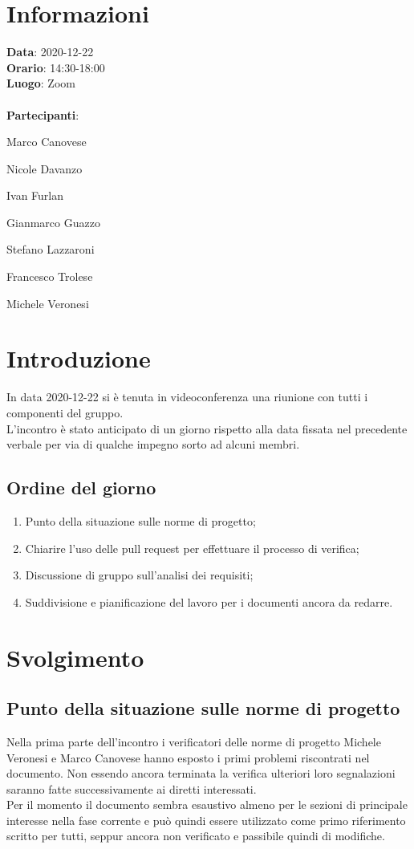 \section{Informazioni}
\textbf{Data}: 2020-12-22\\
\textbf{Orario}: 14:30-18:00\\
\textbf{Luogo}: Zoom\\\\
\textbf{Partecipanti}:\begin{list}{*}{\setlength{\itemsep}{0cm}}
	\item Marco Canovese
	\item Nicole Davanzo
	\item Ivan Furlan
	\item Gianmarco Guazzo
	\item Stefano Lazzaroni
	\item Francesco Trolese
	\item Michele Veronesi
\end{list}

\section{Introduzione}
In data 2020-12-22 si è tenuta in videoconferenza una riunione con tutti i componenti del gruppo. \\
L'incontro è stato anticipato di un giorno rispetto alla data fissata nel precedente verbale per via di qualche impegno sorto ad alcuni membri. 

\subsection{Ordine del giorno}
\begin{enumerate}
    \item Punto della situazione sulle norme di progetto;
    \item Chiarire l'uso delle pull request per effettuare il processo di verifica;
    \item Discussione di gruppo sull'analisi dei requisiti;
    \item Suddivisione e pianificazione del lavoro per i documenti ancora da redarre.
\end{enumerate}

\section{Svolgimento}
\subsection{Punto della situazione sulle norme di progetto} 
Nella prima parte dell'incontro i verificatori delle norme di progetto Michele Veronesi e Marco Canovese hanno esposto i primi problemi riscontrati nel documento. Non essendo ancora terminata la verifica ulteriori loro segnalazioni saranno fatte successivamente ai diretti interessati.\\
Per il momento il documento sembra esaustivo almeno per le sezioni di principale interesse nella fase corrente e può quindi essere utilizzato come primo riferimento scritto per tutti, seppur ancora non verificato e passibile quindi di modifiche.

